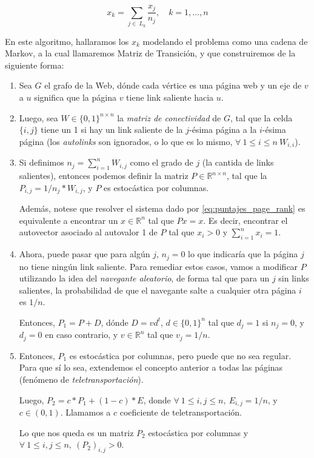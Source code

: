 \begin{equation} \label{eq:puntajes_page_rank}
    x_k = \sum\limits_{j \in\ L_k}{\frac{x_j}{n_j}},\quad k=1,\dots,n
\end{equation}

En este algoritmo, hallaramos los $x_k$ modelando el problema como una cadena de
 Markov, a la cual llamaremos Matriz de Transición, y que construiremos de la siguiente forma:

\begin{enumerate}
	\item Sea $G$ el grafo de la Web, dónde cada vértice es una página web y un
		eje de $v$ a $u$ significa que la página $v$ tiene link saliente hacia $u$.
	\item Luego, sea $W\in\{0,1\}^{n \times n}$ la \textit{matriz de conectividad} de $G$, tal
        que la celda $\{i,j\}$ tiene un 1 si hay un link saliente de la $j$-ésima página
        a la $i$-ésima página (los \textit{autolinks} son ignorados, o lo que es lo mismo,
        $\forall\ 1\leq i\leq n\ W_{i,i}$).
	\item Si definimos $n_j = \sum\limits_{i=1}^{n}{W_{i,j}}$ como el grado de $j$
        (la cantida de links salientes), entonces podemos definir la matriz
        $P\in\mathbb{R}^{n \times n}$, tal que la $P_{i,j} = 1/n_{j} * W_{i,j} $, y
        $P$ es estocástica por columnas.

        Además, notese que resolver el sistema dado por \ref{eq:puntajes_page_rank}
        es equivalente a encontrar un $x\in\mathbb{R}^n$ tal que $Px=x$.
        Es decir, encontrar el autovector asociado al autovalor 1 de $P$ tal que
        $x_i > 0$ y $\sum\limits_{i=1}^{n}{x_i} = 1$.
    \item Ahora, puede pasar que para algún $j$, $n_j = 0$ lo que indicaría que
        la página $j$ no tiene ningún link saliente. Para remediar
        estos casos, vamos a modificar $P$ utilizando la idea del  \textit{navegante
        aleatorio}, de forma tal que para un $j$ sin links salientes, la probabilidad
        de que el navegante salte a cualquier otra página $i$ es $1/n$.

        Entonces, $P_{1} = P + D$, dónde $D = vd^{t}$, $d\in\{0,1\}^{n}$ tal que
        $d_j = 1$ si $n_j = 0$, y $d_j = 0$ en caso contrario, y $v\in\mathbb{R}^n$
         tal que $v_j = 1/n$.
    \item Entonces, $P_{1}$ es estocástica por columnas, pero puede que no sea regular.
        Para que sí lo sea, extendemos el concepto anterior a todas las páginas
        (fenómeno de \textit{teletransportación}).

        Luego, $P_{2} = c*P_{1} + (1-c)*E$, donde $\forall\ 1\leq i,j\leq n,\ E_{i,j} = 1/n$,
        y $c\in(0,1)$. Llamamos a $c$ coeficiente de teletransportación.

        Lo que nos queda es un matriz $P_{2}$ estocástica por columnas y $\forall\ 1\leq i,j\leq n,\ (P_{2})_{i,j} > 0$.
\end{enumerate}

